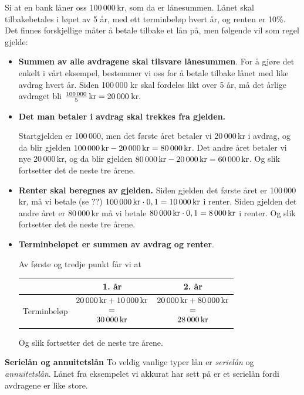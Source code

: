 Si at en bank låner  oss 100\,000\,kr, som da er lånesummen. Lånet skal tilbakebetales i løpet av 5 år, med ett terminbeløp hvert år, og renten er 10\%. Det finnes forskjellige måter å betale tilbake et lån på, men følgende vil som regel gjelde:
\begin{itemize}
	\item \textbf{Summen av alle avdragene skal tilsvare lånesummen}.\os
	 For å gjøre det enkelt i vårt eksempel, bestemmer vi oss for å betale tilbake lånet med like avdrag hvert år. Siden 100\,000 kr skal fordeles likt over 5 år, må det årlige avdraget bli $ \frac{100\,000}{5}\,\textrm{kr}=20\,000 $\,kr.
	\item \textbf{Det man betaler i avdrag skal trekkes fra gjelden.}\os
	
	Startgjelden er 100\,000, men det første året betaler vi 20\,000\,kr i avdrag, og da blir gjelden $100\,000\,\textrm{kr}-20\,000\,\textrm{kr} =80\,000\,\textrm{kr} $. Det andre året betaler vi nye 20\,000\,kr, og da blir gjelden $ 80\,000\,\textrm{kr}-20\,000\,\textrm{kr} =60\,000\,\textrm{kr}  $. Og slik fortsetter det de neste tre årene.
	\item \textbf{Renter skal beregnes av gjelden.}\os 
	Siden gjelden det første året er 100\,000\,kr, må vi betale (se ??) ${ 100\,000\,\textrm{kr}\cdot0,1=10\,000\,\textrm{kr} } $ i renter. Siden gjelden det andre året er 80\,000\,kr må vi betale ${ 80\,000\,\textrm{kr}\cdot0,1=8\,000\,\textrm{kr} } $ i renter.  Og slik fortsetter det de neste tre årene.
	
	\item \textbf{Terminbeløpet er summen av avdrag og renter}.\os
	
	Av første og tredje punkt får vi at\os
	\centering
	\begin{tabular}{c| c |c}
		 & 1. år & 2. år \\ \hline
		Terminbeløp 
			& $\begin{matrix}
			20\,000\,\textrm{kr} +10\,000\,\textrm{kr}\\
			= \\
			30\,000\,\textrm{kr}
			\end{matrix} $  
				& $\begin{matrix}
					20\,000\,\textrm{kr} +80\,000\,\textrm{kr}\\
					= \\
					28\,000\,\textrm{kr}
					\end{matrix} $ 
	\end{tabular}\os
\raggedright 
Og slik fortsetter det de neste tre årene.
\end{itemize}\vsk
\textbf{Serielån og annuitetslån}\os
To veldig vanlige typer lån er \textit{serielån} og \textit{annuitetslån}. Lånet fra eksempelet vi akkurat har sett på er et serielån fordi avdragene er like store. 
\qquad
{}\vsk

